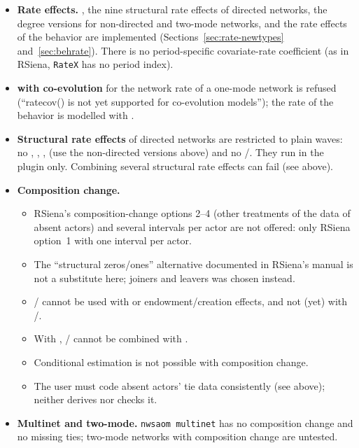 \begin{itemize}
\item \textbf{Rate effects.} , the nine structural rate effects of directed networks, the degree versions for non-directed and two-mode networks, and the rate effects of the behavior are implemented (Sections~\ref{sec:rate-newtypes} and~\ref{sec:behrate}). There is no period-specific covariate-rate coefficient (as in RSiena, \texttt{RateX} has no period index).
\item \textbf{ with co-evolution} for the network rate of a one-mode network is refused (``ratecov() is not yet supported for co-evolution models''); the rate of the behavior is modelled with .
\item \textbf{Structural rate effects} of directed networks are restricted to plain waves: no , , ,  (use the non-directed versions above) and no /. They run in the plugin only. Combining several structural rate effects can fail (see above).
\item \textbf{Composition change.}
  \begin{itemize}[nosep]
  \item RSiena's composition-change options 2--4 (other treatments of the data of absent actors) and several intervals per actor are not offered: only RSiena option~1 with one interval per actor.
  \item The ``structural zeros/ones'' alternative documented in RSiena's manual is not a substitute here; joiners and leavers was chosen instead.
  \item {}/ cannot be used with  or endowment/creation effects, and not (yet) with /.
  \item With , / cannot be combined with .
  \item Conditional estimation is not possible with composition change.
  \item The user must code absent actors' tie data consistently (see above); \nwsaom{} neither derives nor checks it.
  \end{itemize}
\item \textbf{Multinet and two-mode.} \texttt{nwsaom multinet} has no composition change and no missing ties; two-mode networks with composition change are untested.
\end{itemize}
\endgroup
